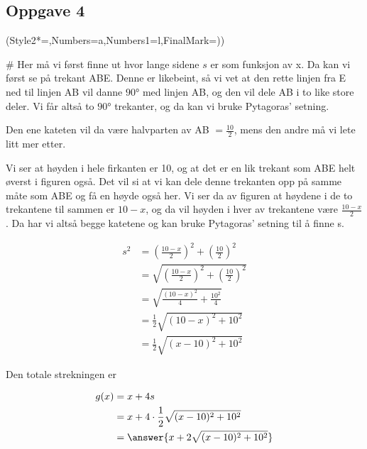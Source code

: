 \subsection*{Oppgave 4}

\begin{easylist}[enumerate]
	\ListProperties(Style2*=,Numbers=a,Numbers1=l,FinalMark={)})
	
	# Her må vi først finne ut hvor lange sidene $s$ er som funksjon av x. Da kan vi først se på trekant ABE. Denne er likebeint, så vi vet at den rette linjen fra E ned til linjen AB vil danne $\ang{90}$ med linjen AB, og den vil dele AB i to like store deler. Vi får altså to $\ang{90}$ trekanter, og da kan vi bruke Pytagoras' setning. 
	
	Den ene kateten vil da være halvparten av AB $ = \frac{10}{2}$, mens den andre må vi lete litt mer etter.
	
	Vi ser at høyden i hele firkanten er 10, og at det er en lik trekant som ABE helt øverst i figuren også. Det vil si at vi kan dele denne trekanten opp på samme måte som ABE og få en høyde også her. Vi ser da av figuren at høydene i de to trekantene til sammen er $10-x$, og da vil høyden i hver av trekantene være $\frac{10-x}{2}$. Da har vi altså begge katetene og kan bruke Pytagoras' setning til å finne s.
	
	\begin{equation*}
	\begin{aligned}
		s^2 &= \left (\frac{10-x}{2} \right)^2	+ \left(\frac{10}{2} \right)^2 \\
		 & = \sqrt{\left (\frac{10-x}{2} \right)^2 + \left(\frac{10}{2} \right)^2} \\
		 & = \sqrt{\frac{(10-x)^2}{4} + \frac{10^2}{4}} \\
		 & = \frac{1}{2} \sqrt{(10-x)^2 + 10^2} \\
		 & = \frac{1}{2} \sqrt{(x-10)^2 + 10^2} 		
	\end{aligned}
	\end{equation*}
	
	Den totale strekningen er
	
	\begin{equation*}
		\begin{aligned}
			g(x) & = x + 4s \\
			& = x + 4 \cdot  \frac{1}{2} \sqrt{(x-10)^2 + 10^2} \\
			& = \answer{x + 2\sqrt{(x-10)^2 + 10^2}}
		\end{aligned}	
	\end{equation*}
	

\end{easylist}
